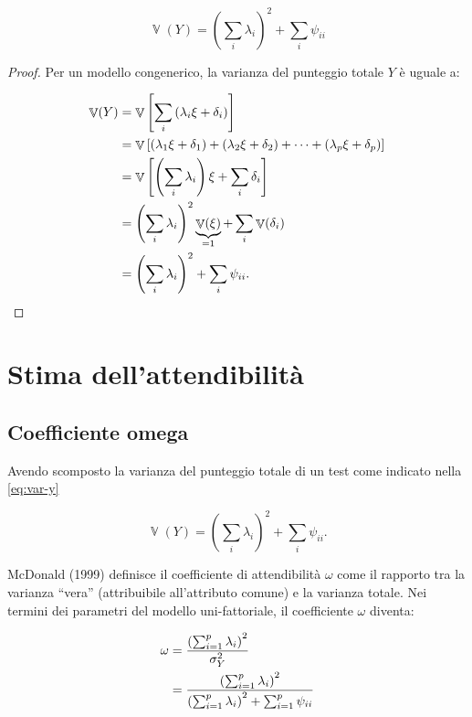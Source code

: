 \documentclass[
  11pt,
]{krantz}
\DeclareMathOperator{\V}{\mathbb{V}} %
\theoremstyle{definition}
\theoremstyle{definition}
\theoremstyle{definition}
\theoremstyle{definition}
\theoremstyle{remark}
\begin{document}
\begin{equation}
 \V(Y) = \left( \sum_i \lambda_i\right)^2 + \sum_i \psi_{ii}
  \label{eq:var-y}
\end{equation}

\begin{proof}
Per un modello congenerico, la varianza del punteggio totale \(Y\) è uguale a:

\begin{equation}
\begin{aligned}
  \V(Y) &= \V\left[ \sum_i  \left(\lambda_i \xi + \delta_i\right)  \right]\notag\\
  &= \V\left[  (\lambda_1 \xi + \delta_1) + (\lambda_2 \xi + \delta_2) + \dots +  (\lambda_p \xi + \delta_p)  \right]\notag\\
  &= \V\left[ \left( \sum_i \lambda_i\right) \xi + \sum_i \delta_i\right]\notag\\
  &=  \left(\sum_i \lambda_i\right)^2 \underbrace{\V(\xi)}_{=1} +  \sum_i  \V(\delta_i)\notag\\
  &= \left(\sum_i \lambda_i\right)^2 + \sum_i \psi_{ii}.\notag
\end{aligned}
\end{equation}
\end{proof}

\hypertarget{stima-dellattendibilituxe0}{%
\section{Stima dell'attendibilità}\label{stima-dellattendibilituxe0}}

\hypertarget{coefficiente-omega}{%
\subsection{Coefficiente omega}\label{coefficiente-omega}}

Avendo scomposto la varianza del punteggio totale di un test come indicato nella \eqref{eq:var-y}

\[
\V(Y) = \left( \sum_i \lambda_i\right)^2 + \sum_i \psi_{ii}.
\]

McDonald (1999) definisce il coefficiente di attendibilità \(\omega\) come il rapporto tra la varianza ``vera'' (attribuibile all'attributo comune) e la varianza totale. Nei termini dei parametri del modello uni-fattoriale, il coefficiente \(\omega\) diventa:

\begin{equation}
\begin{aligned}
\omega &= \frac{\left( \sum_{i=1}^p \lambda_i \right)^2}{\sigma_Y^2} \notag\\
&= \frac{\left( \sum_{i=1}^p \lambda_i \right)^2}{\left( \sum_{i=1}^p \lambda_i \right)^2  + \sum_{i=1}^p \psi_{ii}}
\end{aligned}
\label{eq:omega}
\end{equation}
\end{document}
